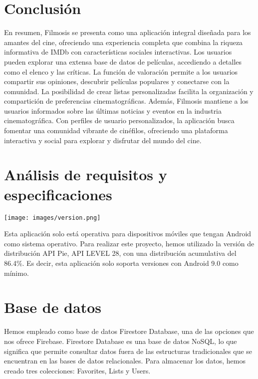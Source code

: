 \documentclass{article}
\begin{document}
\newpage

\section{Conclusión}

En resumen, Filmosis se presenta como una aplicación integral diseñada para los amantes del cine, ofreciendo una experiencia completa que combina la riqueza informativa de IMDb con características sociales interactivas. Los usuarios pueden explorar una extensa base de datos de películas, accediendo a detalles como el elenco y las críticas. La función de valoración permite a los usuarios compartir sus opiniones, descubrir películas populares y conectarse con la comunidad. La posibilidad de crear listas personalizadas facilita la organización y compartición de preferencias cinematográficas. Además, Filmosis mantiene a los usuarios informados sobre las últimas noticias y eventos en la industria cinematográfica. Con perfiles de usuario personalizados, la aplicación busca fomentar una comunidad vibrante de cinéfilos, ofreciendo una plataforma interactiva y social para explorar y disfrutar del mundo del cine.
\section{Análisis de requisitos y especificaciones}
\begin{minipage}{0.4\textwidth}
    \texttt{[image: images/version.png]}
\end{minipage}
\hfill
\begin{minipage}{0.55\textwidth}
Esta aplicación solo está operativa para dispositivos móviles que tengan Android como sistema operativo. Para realizar este proyecto, hemos utilizado la versión de distribución API Pie, API LEVEL 28, con una distribución acumulativa del 86.4\%. Es decir, esta aplicación solo soporta versiones con Android 9.0 como mínimo.
\end{minipage}

\section{Base de datos}
Hemos empleado como base de datos Firestore Database, una de las opciones que nos ofrece Firebase. Firestore Database es una base de datos NoSQL, lo que significa que permite consultar datos fuera de las estructuras tradicionales que se encuentran en las bases de datos relacionales. Para almacenar los datos, hemos creado tres colecciones: Favorites, Lists y Users.
\end{document}
